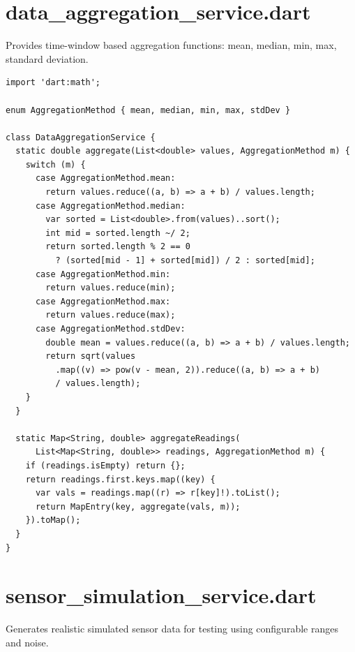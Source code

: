 \documentclass[12pt,a4paper,oneside]{report}
\begin{document}
\section{data\_aggregation\_service.dart}

Provides time-window based aggregation functions: mean, median, min, max, standard deviation.

\begin{lstlisting}[style=dartstyle]
import 'dart:math';

enum AggregationMethod { mean, median, min, max, stdDev }

class DataAggregationService {
  static double aggregate(List<double> values, AggregationMethod m) {
    switch (m) {
      case AggregationMethod.mean:
        return values.reduce((a, b) => a + b) / values.length;
      case AggregationMethod.median:
        var sorted = List<double>.from(values)..sort();
        int mid = sorted.length ~/ 2;
        return sorted.length % 2 == 0
          ? (sorted[mid - 1] + sorted[mid]) / 2 : sorted[mid];
      case AggregationMethod.min:
        return values.reduce(min);
      case AggregationMethod.max:
        return values.reduce(max);
      case AggregationMethod.stdDev:
        double mean = values.reduce((a, b) => a + b) / values.length;
        return sqrt(values
          .map((v) => pow(v - mean, 2)).reduce((a, b) => a + b)
          / values.length);
    }
  }

  static Map<String, double> aggregateReadings(
      List<Map<String, double>> readings, AggregationMethod m) {
    if (readings.isEmpty) return {};
    return readings.first.keys.map((key) {
      var vals = readings.map((r) => r[key]!).toList();
      return MapEntry(key, aggregate(vals, m));
    }).toMap();
  }
}
\end{lstlisting}

\section{sensor\_simulation\_service.dart}

Generates realistic simulated sensor data for testing using configurable ranges and noise.
\end{document}
